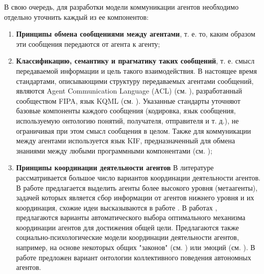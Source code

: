В свою очередь, для разработки модели коммуникации агентов необходимо отдельно уточнить каждый из ее компонентов:

\begin{enumerate}
\item \textbf{Принципы обмена сообщениями между агентами}, т. е. то, каким образом эти сообщения передаются от агента к агенту;
\item \textbf{Классификацию, семантику и прагматику таких сообщений}, т. е. смысл передаваемой информации и цель такого взаимодействия. В настоящее время стандартами, описывающими структуру передаваемых агентами сообщений, являются Agent Communication Language (ACL) (см. ), разработанный сообществом FIPA, язык KQML (см. ). Указанные стандарты уточняют базовые компоненты каждого сообщения (кодировка, язык сообщения, используемую онтологию понятий, получателя, отправителя и т. д.), не ограничивая при этом смысл сообщения в целом. Также для коммуникации между агентами используется язык KIF, предназначенный для обмена знаниями между любыми программными компонентами (см. ); 
\item \textbf{Принципы координации деятельности агентов}
В литературе рассматривается большое число вариантов координации деятельности агентов. В работе  предлагается выделить агенты более высокого уровня (метаагенты), задачей которых является сбор информации от агентов нижнего уровня и их координация, схожие идеи высказываются в работе . В работах ,  предлагаются варианты автоматического выбора оптимального механизма координации агентов для достижения общей цели. Предлагаются также социально-психологические модели координации деятельности агентов, например, на основе некоторых общих "законов"{} (см. ) или эмоций (см. ). В работе  предложен вариант онтологии коллективного поведения автономных агентов.
\end{enumerate}

